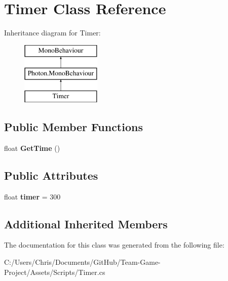 \hypertarget{class_timer}{}\section{Timer Class Reference}
\label{class_timer}
Inheritance diagram for Timer\+:\begin{figure}[H]
\begin{center}
\leavevmode
\includegraphics[height=3.000000cm]{class_timer}
\end{center}
\end{figure}
\subsection*{Public Member Functions}
\begin{DoxyCompactItemize}
\item 
float {\bfseries Get\+Time} ()\hypertarget{class_timer_a9e4207f2a92a1fab9b42559291cb82ee}{}\label{class_timer_a9e4207f2a92a1fab9b42559291cb82ee}

\end{DoxyCompactItemize}
\subsection*{Public Attributes}
\begin{DoxyCompactItemize}
\item 
float {\bfseries timer} = 300\hypertarget{class_timer_a48d2822824c9cc04cf85b5b9603a7934}{}\label{class_timer_a48d2822824c9cc04cf85b5b9603a7934}

\end{DoxyCompactItemize}
\subsection*{Additional Inherited Members}


The documentation for this class was generated from the following file\+:\begin{DoxyCompactItemize}
\item 
C\+:/\+Users/\+Chris/\+Documents/\+Git\+Hub/\+Team-\/\+Game-\/\+Project/\+Assets/\+Scripts/Timer.\+cs\end{DoxyCompactItemize}
